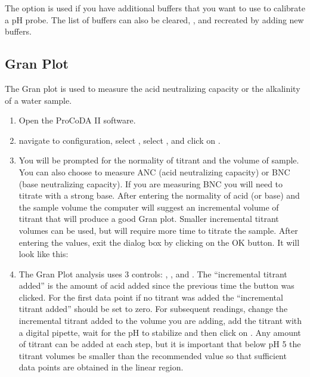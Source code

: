 \documentclass[letterpaper,10pt,english]{sphinxmanual}
\begin{document}
The  option is used if you have additional buffers that you want to use to calibrate a pH probe. The list of buffers can also be cleared, , and recreated by adding new buffers.


\subsection{Gran Plot}
\label{\detokenize{ProCoDA/ProCoDA:gran-plot}}\label{\detokenize{ProCoDA/ProCoDA:heading-procoda-gran-plot}}
The Gran plot is used to measure the acid neutralizing capacity or the alkalinity of a water sample.
\begin{enumerate}
\item {} 
Open the ProCoDA II software.

\item {} 
navigate to configuration, select , select , and click on .

\item {} 
You will be prompted for the normality of titrant and the volume of sample.  You can also choose to measure ANC (acid neutralizing capacity) or BNC (base neutralizing capacity). If you are measuring BNC you will need to titrate with a strong base. After entering the normality of acid (or base) and the sample volume the computer will suggest an incremental volume of titrant that will produce a good Gran plot. Smaller incremental titrant volumes can be used, but will require more time to titrate the sample. After entering the values, exit the dialog box by clicking on the OK button. It will look like this: 

\item {} 
The Gran Plot analysis uses 3 controls: , , and . The “incremental titrant added”  is the amount of acid added since the previous time the  button was clicked. For the first data point if no titrant was added the “incremental titrant added” should be set to zero. For subsequent readings, change the incremental titrant added to the volume you are adding, add the titrant with a digital pipette, wait for the pH to stabilize and then click on . Any amount of titrant can be added at each step, but it is important that below pH 5 the titrant volumes be smaller than the recommended value so that sufficient data points are obtained in the linear region.


\end{enumerate}
\end{document}
